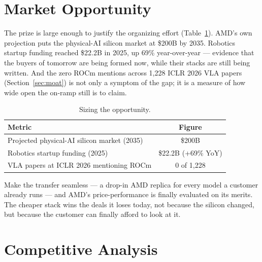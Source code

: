 \documentclass[blind]{gtac}
\begin{document}
\section{Market Opportunity}
\label{sec:market}

The prize is large enough to justify the organizing effort (Table~\ref{tab:market}). AMD's own projection puts the physical-AI silicon market at \$200B by 2035. Robotics startup funding reached \$22.2B in 2025, up 69\% year-over-year --- evidence that the buyers of tomorrow are being formed now, while their stacks are still being written. And the zero ROCm mentions across 1{,}228 ICLR 2026 VLA papers (Section~\ref{sec:moat}) is not only a symptom of the gap; it is a measure of how wide open the on-ramp still is to claim.

\begin{table}[H]
\centering
\caption{Sizing the opportunity.}
\label{tab:market}
\tiny
\begin{tabular}{@{}lc@{}}
\toprule
Metric & Figure \\
\midrule
Projected physical-AI silicon market (2035) & \$200B \\
Robotics startup funding (2025) & \$22.2B (+69\% YoY) \\
VLA papers at ICLR 2026 mentioning ROCm & 0 of 1{,}228 \\
\bottomrule
\end{tabular}
\end{table}

Make the transfer seamless --- a drop-in AMD replica for every model a customer already runs --- and AMD's price-performance is finally evaluated on its merits. The cheaper stack wins the deals it loses today, not because the silicon changed, but because the customer can finally afford to look at it.

\section{Competitive Analysis}
\label{sec:competitive}
\end{document}
